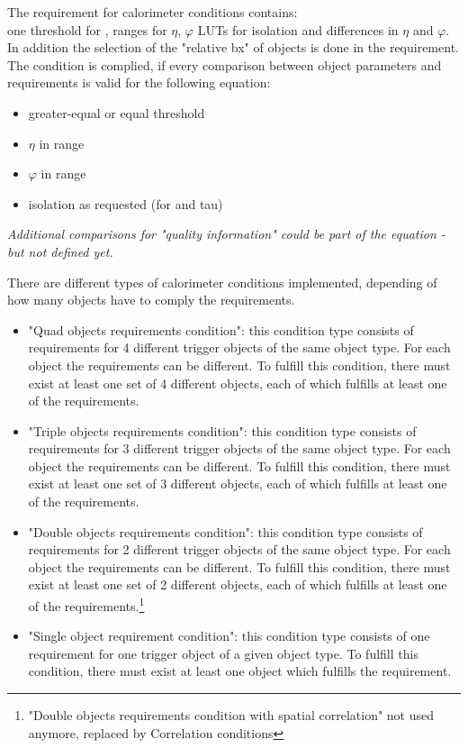 The requirement for calorimeter conditions contains:\\
one threshold for \et, ranges for $\eta$, $\varphi$ LUTs for isolation and differences in $\eta$ and $\varphi$. In addition the selection of the "relative bx" of objects
is done in the requirement.\\
The condition is complied, if every comparison between object parameters and requirements is valid for the following equation:
\begin{itemize}
\item \et greater-equal or equal threshold
\item $\eta$ in range
\item $\varphi$ in range
\item isolation as requested (for \egamma and tau)
\end{itemize}
\textit{Additional comparisons for "quality information" could be part of the equation - but not defined yet.}

There are different types of calorimeter conditions implemented, depending of how many objects have to comply the requirements.
\begin{itemize}
\item "Quad objects requirements condition": this condition type consists of requirements for 4 different trigger objects of the same object type. 
For each object the requirements can be different. To fulfill this condition, there must exist at least one set of 4 different objects,
each of which fulfills at least one of the requirements.
\item "Triple objects requirements condition": this condition type consists of requirements for 3 different trigger objects of the same object type. 
For each object the requirements can be different. To fulfill this condition, there must exist at least one set of 3 different objects,
each of which fulfills at least one of the requirements.
\item "Double objects requirements condition": this condition type consists of requirements for 2 different trigger objects of the same object type. 
For each object the requirements can be different. To fulfill this condition, there must exist at least one set of 2 different objects,
each of which fulfills at least one of the requirements.\footnote{"Double objects requirements condition with spatial correlation" not used anymore, replaced by Correlation conditions}
\item "Single object requirement condition": this condition type consists of one requirement for one trigger object of a given object type. 
To fulfill this condition, there must exist at least one object which fulfills the requirement.

\end{itemize}

